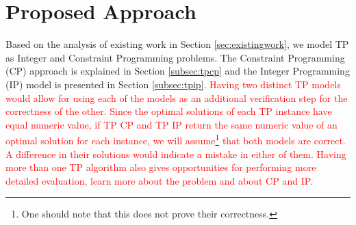\documentclass{mprop}
\makeatletter
\theoremstyle{definition}
\newcommand{\specialcell}[2][c]{%
  \begin{tabular}[#1]{@{}c@{}}#2\end{tabular}}
\makeatother
\begin{document}


\section{Proposed Approach}
\label{sec:proposedapproach}
Based on the analysis of existing work in Section \ref{sec:existingwork}, we model TP as Integer and Constraint Programming problems. The Constraint Programming (CP) approach is explained in Section \ref{subsec:tpcp} and the Integer Programming (IP) model is presented in Section \ref{subsec:tpip}. \textcolor{red}{
Having two distinct TP models would allow for using each of the models as an additional verification step for the correctness of the other. Since the optimal solutions of each TP instance have equal numeric value, if TP CP and TP IP return the same numeric value of an optimal solution for each instance, we will assume\footnote{One should note that this does not prove their correctness.} that both models are correct. A difference in their solutions would indicate a mistake in either of them. Having more than one TP algorithm also gives opportunities for performing more detailed evaluation, learn more about the problem and about CP and IP.}
\end{document}
